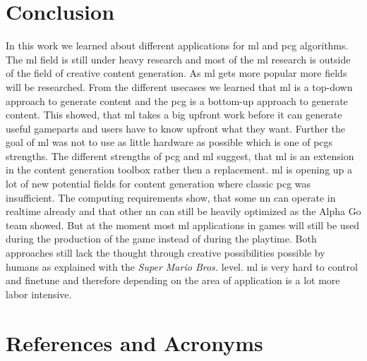 \documentclass[10pt,a4paper]{article}
\begin{document}
\section{Conclusion}
In this work we learned about different applications for \gls{ml} and \gls{pcg} algorithms. The \gls{ml} field is still under heavy research and most of the \gls{ml} research is outside of the field of creative content generation. As \gls{ml} gets more popular more fields will be researched. From the different usecases we learned that \gls{ml} is a top-down approach to generate content and the \gls{pcg} is a bottom-up approach to generate content. This showed, that \gls{ml} takes a big upfront work before it can generate useful gameparts and users have to know upfront what they want. Further the goal of \gls{ml} was not to use as little hardware as possible which is one of \gls{pcg}s strengths. The different strengths of \gls{pcg} and \gls{ml} suggest, that \gls{ml} is an extension in the content generation toolbox rather then a replacement. \gls{ml} is opening up a lot of new potential fields for content generation where classic \gls{pcg} was insufficient. The computing requirements show, that some \gls{nn} can operate in realtime already and that other \gls{nn} can still be heavily optimized as the Alpha Go team showed. But at the moment most \gls{ml} applications in games will still be used during the production of the game instead of during the playtime. Both approaches still lack the thought through creative possibilities possible by humans as explained with the \textit{Super Mario Bros.} level. \gls{ml} is very hard to control and finetune and therefore depending on the area of application is a lot more labor intensive.

\section{References and Acronyms}

\printglossaries


%
%

%


\listoffigures

\end{document}
